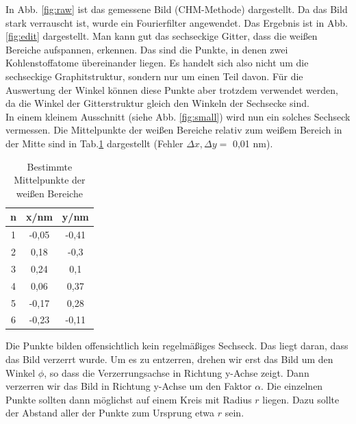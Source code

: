 In Abb. \ref{fig:raw} ist das gemessene Bild (CHM-Methode) dargestellt. Da das Bild stark verrauscht ist, wurde ein Fourierfilter angewendet. Das Ergebnis ist in Abb. \ref{fig:edit} dargestellt. Man kann gut das sechseckige Gitter, dass die weißen Bereiche aufspannen, erkennen. Das sind die Punkte, in denen zwei Kohlenstoffatome übereinander liegen. Es handelt sich also nicht um die sechseckige Graphitstruktur, sondern nur um einen Teil davon. Für die Auswertung der Winkel können diese Punkte aber trotzdem verwendet werden, da die Winkel der Gitterstruktur gleich den Winkeln der Sechsecke sind.\\

In einem kleinem Ausschnitt (siehe Abb. \ref{fig:small}) wird nun ein solches Sechseck vermessen. Die Mittelpunkte der weißen Bereiche relativ zum weißem Bereich in der Mitte sind in Tab.\ref{tab:points} dargestellt (Fehler $\Delta x,\Delta y=$ 0,01 nm).

\begin{table}
\centering
\caption{Bestimmte Mittelpunkte der weißen Bereiche}
\begin{tabular}{ccc}
\toprule
n & x/nm & y/nm\\
\midrule
1 & -0,05 &-0,41\\
2 & 0,18&	-0,3\\
3 & 0,24&	0,1\\
4 & 0,06&	0,37\\
5 & -0,17&	0,28\\
6 & -0,23&	-0,11\\
\bottomrule
\end{tabular}
\label{tab:points}
\end{table}
 
Die Punkte bilden offensichtlich kein regelmäßiges Sechseck. Das liegt daran, dass das Bild verzerrt wurde. Um es zu entzerren, drehen wir erst das Bild um den Winkel $\phi$, so dass die Verzerrungsachse in Richtung y-Achse zeigt. Dann verzerren wir das Bild in Richtung y-Achse um den Faktor $\alpha$. Die einzelnen Punkte sollten dann möglichst auf einem Kreis mit Radius $r$ liegen. Dazu sollte der Abstand aller der Punkte zum Ursprung etwa $r$ sein.\\

